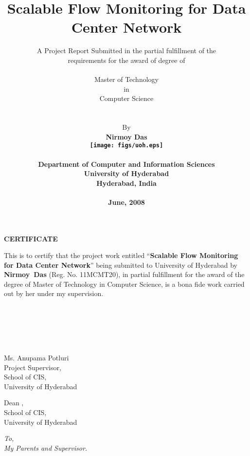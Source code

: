 \documentclass[a4,12pt,oneside]{book}
\title{\bfseries\huge Scalable Flow Monitoring for Data Center Network }
\author{A Project Report Submitted in the partial fulfillment of the \\requirements for the award of degree of \\
    \\{\Large Master of Technology}\\in\\{\Large Computer Science}\\\\\\By\\\bf{Nirmoy Das}
  \vspace*{.2in}\\
    \texttt{[image: figs/uoh.eps]}\\ \\Department of
  Computer and Information  Sciences\\University of
    Hyderabad\\Hyderabad, India\\ \\June, 2008 }
\date{}
\renewenvironment{frontmatter}{\pagenumbering{roman}}{\newpage
  \pagenumbering{arabic}}
\newenvironment{dedication}{
  \thispagestyle{empty}
  \clearpage\null\vfill
  \sl \hspace{1in}To,\\
  
  \hspace{1.5in}}{
  \vspace{3in}\vfill\null}
\def\prefacesection#1{%
  \chapter*{#1}
  \addcontentsline{toc}{chapter}{#1}
  \markboth{#1}{#1}}
\newenvironment{abstract}{\null\vfil\prefacesection{Abstract}}{\par\vfill\null}
\newenvironment{acknowledgments}{\null\vfil\prefacesection{Acknowledgments}}{\par\vfill\null}
\begin{document}
  \maketitle
 \onehalfspacing


 \begin{frontmatter}

    {%
     \thispagestyle{empty}
\begin{center} \textbf{\large CERTIFICATE}  \end{center}\vspace{.75in}
{\sloppy This is to certify that the project work entitled ``\textbf{Scalable Flow Monitoring for Data Center Network}'' being
    submitted to University of Hyderabad by \textbf{\mbox{Nirmoy Das}}
    (Reg. No. 11MCMT20), in partial fulfillment for the award of the degree of
    Master of Technology in Computer Science, is a bona fide work
    carried out by her under my supervision.}\\ \\ \\ \\ \\ \\

\parbox[t]{3in}{\flushleft Ms. Anupama Potluri\\
Project Supervisor,\\
School of CIS,\\
University of Hyderabad\\}

\vspace{1.5in}
\parbox[t]{3in}{\flushleft 
Dean ,\\
School of CIS,\\
University of Hyderabad\\}
}

    \begin{dedication}
    \thispagestyle{empty}
      My Parents and Supervisor.
    \end{dedication}
    
    
%      
    
    \tableofcontents
\end{frontmatter}
  
\end{document}
